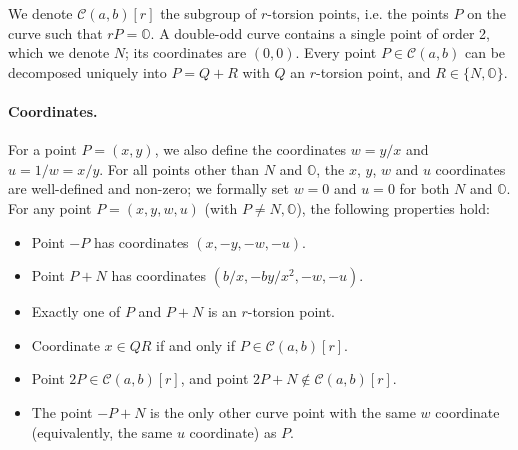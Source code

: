 \documentclass{llncs}
\newcommand{\QR}{QR}
\newcommand{\cC}{\mathcal{C}}
\newcommand{\neutral}{\mathbb{O}}
\begin{document}
We denote $\cC(a,b)[r]$ the subgroup of $r$-torsion points, i.e. the
points $P$ on the curve such that $rP = \neutral$. A double-odd curve
contains a single point of order 2, which we denote $N$; its coordinates
are $(0, 0)$. Every point $P\in\cC(a,b)$ can be decomposed uniquely into
$P = Q + R$ with $Q$ an $r$-torsion point, and $R\in\{N,\neutral\}$.

\paragraph{Coordinates.}
For a point $P = (x,y)$, we also define the coordinates $w = y/x$ and $u
= 1/w = x/y$. For all points other than $N$ and $\neutral$, the $x$,
$y$, $w$ and $u$ coordinates are well-defined and non-zero; we formally
set $w = 0$ and $u = 0$ for both $N$ and $\neutral$. For any point $P =
(x,y,w,u)$ (with $P \neq N, \neutral$), the following properties hold:
\begin{itemize}
    \item Point $-P$ has coordinates $(x, -y, -w, -u)$.
    \item Point $P+N$ has coordinates $(b/x, -by/x^2, -w, -u)$.
    \item Exactly one of $P$ and $P+N$ is an $r$-torsion point.
    \item Coordinate $x\in\QR$ if and only if $P\in\cC(a,b)[r]$.
    \item Point $2P \in\cC(a,b)[r]$, and point $2P+N \notin\cC(a,b)[r]$.
    \item The point $-P+N$ is the only other curve point with the
    same $w$ coordinate (equivalently, the same $u$ coordinate) as $P$.
\end{itemize}
\end{document}
